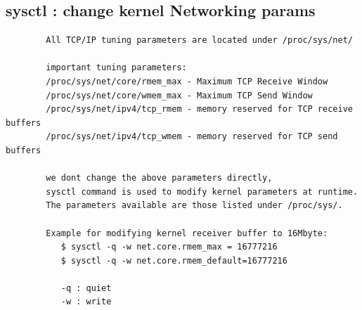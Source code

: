 \documentclass[a4paper,12pt]{article}
\begin{document}
\subsection{sysctl : change kernel Networking params}
\begin{verbatim}
        All TCP/IP tuning parameters are located under /proc/sys/net/
        
        important tuning parameters:
        /proc/sys/net/core/rmem_max - Maximum TCP Receive Window
        /proc/sys/net/core/wmem_max - Maximum TCP Send Window
        /proc/sys/net/ipv4/tcp_rmem - memory reserved for TCP receive buffers
        /proc/sys/net/ipv4/tcp_wmem - memory reserved for TCP send buffers
        
        we dont change the above parameters directly,
        sysctl command is used to modify kernel parameters at runtime.
        The parameters available are those listed under /proc/sys/.
        
        Example for modifying kernel receiver buffer to 16Mbyte:
           $ sysctl -q -w net.core.rmem_max = 16777216
           $ sysctl -q -w net.core.rmem_default=16777216
           
           -q : quiet
           -w : write
           
\end{verbatim}
\end{document}

